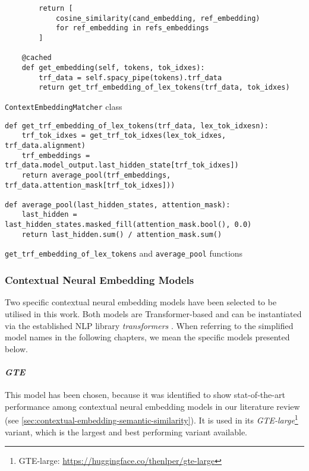 \documentclass[11pt]{scrreprt}
\let\cite\parencite  %
\begin{document}
{\begin{pseudo}[p!]
\begin{lstlisting}
        return [
            cosine_similarity(cand_embedding, ref_embedding)
            for ref_embedding in refs_embeddings
        ]

    @cached
    def get_embedding(self, tokens, tok_idxes):
        trf_data = self.spacy_pipe(tokens).trf_data
        return get_trf_embedding_of_lex_tokens(trf_data, tok_idxes)
\end{lstlisting}
\caption{\texttt{ContextEmbeddingMatcher} class}
\label{psd:contextualmatcher-class}
\end{pseudo}


\begin{pseudo}[p!]
\begin{lstlisting}
def get_trf_embedding_of_lex_tokens(trf_data, lex_tok_idxesn):
    trf_tok_idxes = get_trf_tok_idxes(lex_tok_idxes, trf_data.alignment)
    trf_embeddings = trf_data.model_output.last_hidden_state[trf_tok_idxes])
    return average_pool(trf_embeddings, trf_data.attention_mask[trf_tok_idxes]))

def average_pool(last_hidden_states, attention_mask):
    last_hidden = last_hidden_states.masked_fill(attention_mask.bool(), 0.0)
    return last_hidden.sum() / attention_mask.sum()
\end{lstlisting}
\caption{\texttt{get\_trf\_embedding\_of\_lex\_tokens} and \texttt{average\_pool} functions}
\label{psd:get-mebedding-subfunction}
\end{pseudo}



\subsubsection{Contextual Neural Embedding Models}
Two specific contextual neural embedding models have been selected to be utilised in this work. Both models are Transformer-based and can be instantiated via the established NLP library \textit{transformers} \cite{wolfTransformersStateoftheArtNatural2020}. When referring to the simplified model names in the following chapters, we mean the specific models presented below.

\paragraph{\textit{GTE}} This model has been chosen, because it was identified to show stat-of-the-art performance among contextual neural embedding models in our literature review (see \cref{sec:contextual-embedding-semantic-similarity}). It is used in its \textit{GTE-large}\footnote{GTE-large: \url{https://huggingface.co/thenlper/gte-large}} variant, which is the largest and best performing variant available.

}
\end{document}
